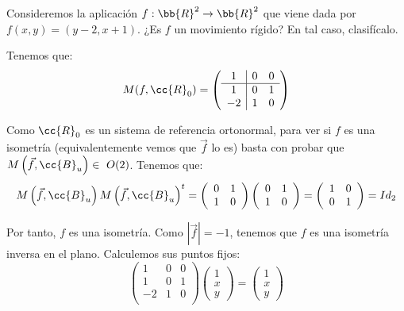 \begin{ejercicio}
    Consideremos la aplicación $f : \bb{R}^2 \to \bb{R}^2$ que viene dada por $f(x, y) = (y -2, x+ 1)$.
    ¿Es $f$ un movimiento rígido? En tal caso, clasifícalo.

    Tenemos que:
    \begin{equation*}
        M(f,\cc{R}_0) = \left(
        \begin{array}{c|cc}
            1 & 0 & 0 \\ \hline
            1 & 0 & 1 \\
            -2 & 1 & 0 \\
        \end{array}
        \right)
    \end{equation*}

    Como $\cc{R}_0$ es un sistema de referencia ortonormal, para ver si $f$ es una isometría (equivalentemente vemos que $\vec{f}$ lo es) basta con probar que
    $M\left(\vec{f}, \cc{B}_u\right)\in~O(2)$. Tenemos que:
    \begin{equation*}
        M\left(\vec{f},\cc{B}_u\right)M\left(\vec{f},\cc{B}_u\right)^t
        = 
        \left(
        \begin{array}{cc}
            0 & 1 \\
            1 & 0 \\
        \end{array}
        \right)
        \left(
        \begin{array}{cc}
            0 & 1 \\
            1 & 0 \\
        \end{array}
        \right)
        = 
        \left(
        \begin{array}{cc}
            1 & 0 \\
            0 & 1 \\
        \end{array}
        \right) = Id_2
    \end{equation*}

    Por tanto, $f$ es una isometría. Como $\left|\vec{f}\right|=-1$, tenemos que $f$ es una isometría inversa en el plano. Calculemos sus puntos fijos:
    \begin{equation*}
        \left(
        \begin{array}{c|cc}
            1 & 0 & 0 \\ \hline
            1 & 0 & 1 \\
            -2 & 1 & 0 \\
        \end{array}
        \right)
        \left(
        \begin{array}{c}
            1\\x\\y
        \end{array}
        \right)
        =\left(
            \begin{array}{c}
                1\\x\\y
            \end{array}
        \right)
    \end{equation*}


\end{ejercicio}

